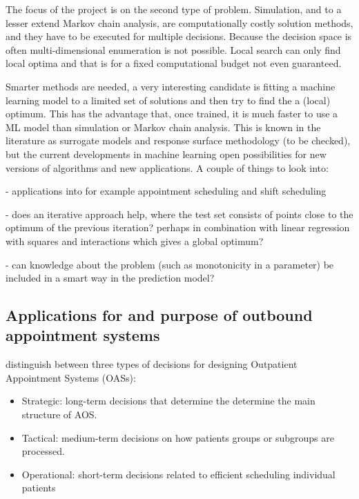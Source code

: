\documentclass[
  10pt,
  letterpaper,
]{article}
\providecommand{\tightlist}{%
  \setlength{\itemsep}{0pt}\setlength{\parskip}{0pt}}\usepackage{longtable,booktabs,array}
\begin{document}
The focus of the project is on the second type of problem. Simulation,
and to a lesser extend Markov chain analysis, are computationally costly
solution methods, and they have to be executed for multiple decisions.
Because the decision space is often multi-dimensional enumeration is not
possible. Local search can only find local optima and that is for a
fixed computational budget not even guaranteed.

Smarter methods are needed, a very interesting candidate is fitting a
machine learning model to a limited set of solutions and then try to
find the a (local) optimum. This has the advantage that, once trained,
it is much faster to use a ML model than simulation or Markov chain
analysis. This is known in the literature as surrogate models and
response surface methodology (to be checked), but the current
developments in machine learning open possibilities for new versions of
algorithms and new applications. A couple of things to look into:

- applications into for example appointment scheduling and shift
scheduling

- does an iterative approach help, where the test set consists of points
close to the optimum of the previous iteration? perhaps in combination
with linear regression with squares and interactions which gives a
global optimum?

- can knowledge about the problem (such as monotonicity in a parameter)
be included in a smart way in the prediction model?

\hypertarget{applications-for-and-purpose-of-outbound-appointment-systems}{%
\subsection{Applications for and purpose of outbound appointment
systems}\label{applications-for-and-purpose-of-outbound-appointment-systems}}

\citep{ahmadijavid_outpatient_2017} distinguish between three types of
decisions for designing Outpatient Appointment Systems (OASs):

\begin{itemize}
\tightlist
\item
  Strategic: long-term decisions that determine the determine the main
  structure of AOS.
\item
  Tactical: medium-term decisions on how patients groups or subgroups
  are processed.
\item
  Operational: short-term decisions related to efficient scheduling
  individual patients
\end{itemize}
\end{document}
